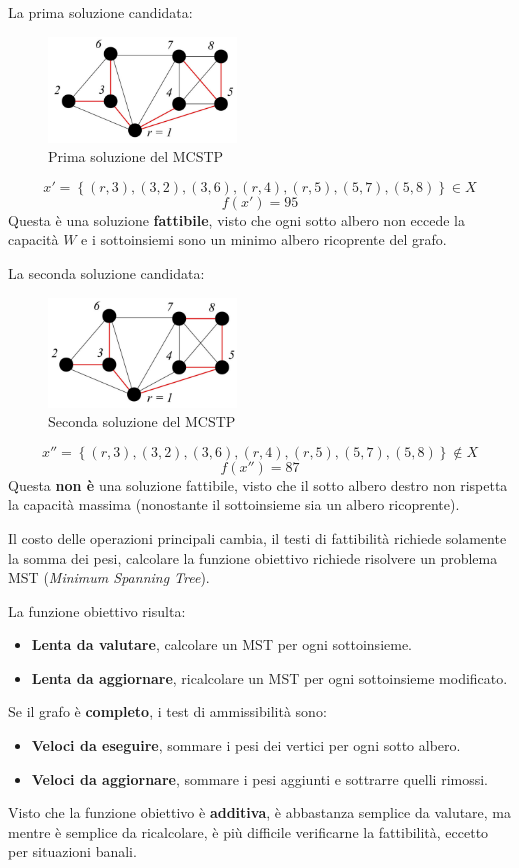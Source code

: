 \documentclass{article}
\begin{document}
La prima soluzione candidata:

\begin{figure}[H]
    \centering
    \includegraphics[width=5cm]{images/MCSTP_fst_sol.png}
    \caption{Prima soluzione del MCSTP}
    \label{fig:fst_sol_MCSTP}
\end{figure}

$$x'=\left\{(r,3),(3,2),(3,6),(r,4),(r,5),(5,7),(5,8)\right\}\in X$$
$$f(x')=95$$
Questa è una soluzione \textbf{fattibile}, visto che ogni sotto albero non eccede la
capacità $W$ e i sottoinsiemi sono un minimo albero ricoprente del grafo.

La seconda soluzione candidata:

\begin{figure}[H]
    \centering
    \includegraphics[width=5cm]{images/MCSTP_snd_sol.png}
    \caption{Seconda soluzione del MCSTP}
    \label{fig:snd_sol_MCSTP}
\end{figure}

$$x''=\left\{(r,3),(3,2),(3,6),(r,4),(r,5),(5,7),(5,8)\right\}\notin X$$
$$f(x'')=87$$
Questa \textbf{non è} una soluzione fattibile, visto che il sotto albero destro non rispetta
la capacità massima (nonostante il sottoinsieme sia un albero ricoprente).

Il costo delle operazioni principali cambia, il testi di fattibilità richiede solamente la somma
dei pesi, calcolare la funzione obiettivo richiede risolvere un problema
MST (\textit{Minimum Spanning Tree}).

La funzione obiettivo risulta:
\begin{itemize}
    \item \textbf{Lenta da valutare}, calcolare un MST per ogni sottoinsieme.
    \item \textbf{Lenta da aggiornare}, ricalcolare un MST per ogni sottoinsieme modificato.
\end{itemize}
Se il grafo è \textbf{completo}, i test di ammissibilità sono:
\begin{itemize}
    \item \textbf{Veloci da eseguire}, sommare i pesi dei vertici per ogni sotto albero.
    \item \textbf{Veloci da aggiornare}, sommare i pesi aggiunti e sottrarre quelli rimossi.
\end{itemize}
Visto che la funzione obiettivo è \textbf{additiva}, è abbastanza semplice da valutare, ma mentre
è semplice da ricalcolare, è più difficile verificarne la fattibilità, eccetto per situazioni banali.
\end{document}

